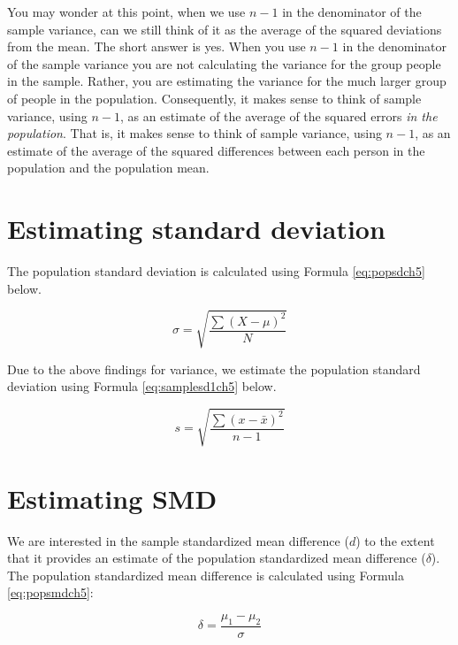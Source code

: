 \documentclass[
]{krantz}
\begin{document}
You may wonder at this point, when we use \(n-1\) in the denominator of the sample variance, can we still think of it as the average of the squared deviations from the mean. The short answer is yes. When you use \(n-1\) in the denominator of the sample variance you are not calculating the variance for the group people in the sample. Rather, you are estimating the variance for the much larger group of people in the population. Consequently, it makes sense to think of sample variance, using \(n-1\), as an estimate of the average of the squared errors \emph{in the population}. That is, it makes sense to think of sample variance, using \(n-1\), as an estimate of the average of the squared differences between each person in the population and the population mean.

\hypertarget{estimating-standard-deviation}{%
\section{Estimating standard deviation}\label{estimating-standard-deviation}}

The population standard deviation is calculated using Formula \eqref{eq:popsdch5} below.

\begin{equation} 
\sigma = \sqrt{\frac{\sum{(X- \mu)^2}}{N}}
      \label{eq:popsdch5}
\end{equation}

Due to the above findings for variance, we estimate the population standard deviation using Formula \eqref{eq:samplesd1ch5} below.

\begin{equation} 
s = \sqrt{\frac{\sum{(x - \bar{x})^2}}{n-1}}
      \label{eq:samplesd1ch5}
\end{equation}

\hypertarget{estimating-smd}{%
\section{Estimating SMD}\label{estimating-smd}}

We are interested in the sample standardized mean difference (\(d\)) to the extent that it provides an estimate of the population standardized mean difference (\(\delta\)). The population standardized mean difference is calculated using Formula \eqref{eq:popsmdch5}:

\begin{equation} 
\delta  = \frac{\mu_{1} - \mu_{2}}{\sigma} 
      \label{eq:popsmdch5}
\end{equation}
\end{document}
